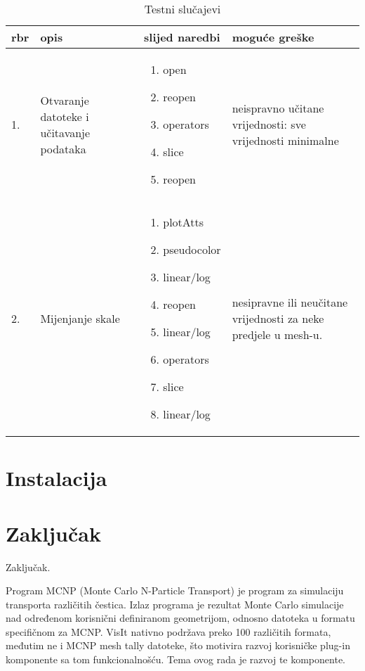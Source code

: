\documentclass[times, utf8, zavrsni]{fer}
\begin{document}
	\begin{table}[H]
        \centering
        \def\arraystretch{1.5}
        \begin{tabular}{|l|p{80pt}| p{100pt} | p{120pt} |}
        \hline
        rbr & opis & slijed naredbi & moguće greške\\ \hline
        1. & Otvaranje datoteke i učitavanje podataka &
         \begin{enumerate}
         	\item open
         	\item reopen
         	\item operators
         	\item slice
         	\item reopen
         \end{enumerate}
         & neispravno učitane vrijednosti: sve vrijednosti minimalne\\
        \hline
         2. & Mijenjanje skale & \begin{enumerate}
        \item plotAtts
        \item pseudocolor
        \item linear/log
        \item reopen
        \item linear/log
        \item operators
        \item slice
        \item linear/log
        \end{enumerate}
        & nesipravne ili neučitane vrijednosti za neke predjele u mesh-u.\\
    \hline
        \end{tabular}
        \caption{Testni slučajevi}
        \end{table}
	


\chapter{Instalacija}

\chapter{Zaključak}
Zaključak.




\begin{sazetak}
Program MCNP (Monte Carlo N-Particle Transport) je program za simulaciju transporta različitih čestica.
Izlaz programa je rezultat Monte Carlo simulacije nad određenom korisnični definiranom geometrijom, odnosno datoteka u formatu specifičnom za MCNP.
VisIt nativno podržava preko 100 različitih formata, međutim ne i MCNP mesh tally datoteke, što motivira razvoj korisničke plug-in komponente sa tom funkcionalnošću.
Tema ovog rada je razvoj te komponente.

\end{sazetak}
\end{document}
